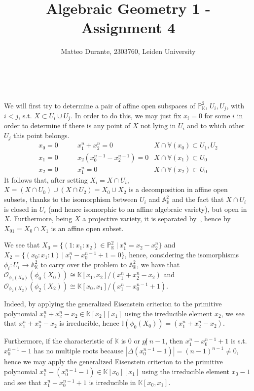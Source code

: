 \documentclass{article}
\newcommand{\numberset}{\mathbb}
\newcommand{\K}{\numberset{K}}
\newcommand{\I}{\mathbb{I}}
\newcommand{\V}{\mathbb{V}}
\newcommand{\A}{\mathbb{A}}
\newcommand{\Ps}{\mathbb{P}}
\newcommand{\exercise}[1]{\noindent {\bf Exercise #1}}
\begin{document}
\title{Algebraic Geometry 1 - Assignment 4}

\author{Matteo Durante, 2303760, Leiden University}

\maketitle


~\\
\exercise{6.6.7}

We will first try to determine a pair of affine open subspaces of $\Ps^2_{\K}$, $U_i,U_j$, with $i<j$, s.t. $X\subset U_i\cup U_j$. In order to do this, we may just fix $x_i=0$ for some $i$ in order to determine if there is any point of $X$ not lying in $U_i$ and to which other $U_j$ this point belongs.
\begin{align*}
  x_0=0 \quad\quad & x_1^n+x_2^n=0 & X\cap\V(x_0)\subset U_1,U_2 \\
  x_1=0 \quad\quad & x_2(x_0^{n-1}-x_2^{n-1})=0 & X\cap\V(x_1)\subset U_0 \\
  x_2=0 \quad\quad & x_1^n=0 & X\cap\V(x_2)\subset U_0
\end{align*}
It follows that, after setting $X_i=X\cap U_i$, $X=(X\cap U_0)\cup (X\cap U_2)=X_0\cup X_2$ is a decomposition in affine open subsets, thanks to the isomorphism between $U_i$ and $\A^2_{\K}$ and the fact that $X\cap U_i$ is closed in $U_i$ (and hence isomorphic to an affine algebraic variety), but open in $X$. Furthermore, being $X$ a projective variety, it is separated by~\cite[ex. 6.6.1]{edix}, hence by~\cite[prop. 6.1.5]{edix} $X_{01}=X_0\cap X_1$ is an affine open subset.

We see that $X_0=\{(1:x_1:x_2)\in\Ps^2_{\K}\ |\ x_1^n=x_2-x_2^n\}$ and $X_2=\{(x_0:x_1:1)\ |\ x_1^n-x_0^{n-1}+1=0\}$, hence, considering the isomorphisms $\phi_i:U_i\rightarrow\A^2_{\K}$ to carry over the problem to $\A^2_{\K}$, we have that $\mathcal{O}_{\phi_0(X_0)}(\phi_0(X_0))\cong\K[x_1,x_2]/(x_1^n+x_2^n-x_2)$ and $\mathcal{O}_{\phi_2(X_2)}(\phi_2(X_2))\cong\K[x_0,x_1]/(x_1^n-x_0^{n-1}+1)$.

Indeed, by applying the generalized Eisenstein criterion to the primitive polynomial $x_1^n+x_2^n-x_2\in\K[x_2][x_1]$ using the irreducible element $x_2$, we see that $x_1^n+x_2^n-x_2$ is irreducible, hence $\I(\phi_0(X_0))=(x_1^n+x_2^n-x_2)$.

Furthermore, if the characteristic of $\K$ is 0 or $p\not |\ n-1$, then $x_1^n-x_0^{n-1}+1$ is s.t. $x_0^{n-1}-1$ has no multiple roots because $|\Delta(x_0^{n-1}-1)|=(n-1)^{n-1}\neq 0$, hence we may apply the generalized Eisenstein criterion to the primitive polynomial $x_1^n-(x_0^{n-1}-1)\in\K[x_0][x_1]$ using the irreducible element $x_0-1$ and see that $x_1^n-x_0^{n-1}+1$ is irreducible in $\K[x_0,x_1]$.
\end{document}
